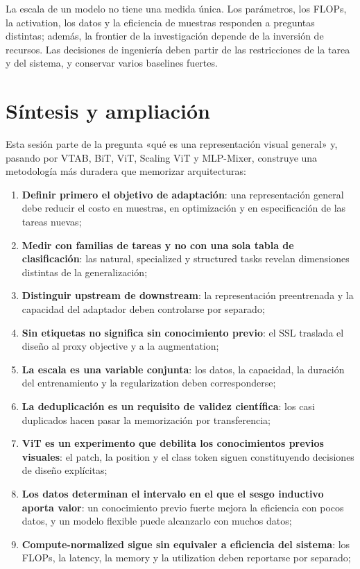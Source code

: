 \documentclass[a4paper]{article}
\begin{document}
La escala de un modelo no tiene una medida única. Los parámetros, los FLOPs, la activation, los datos y la eficiencia de muestras responden a preguntas distintas; además, la frontier de la investigación depende de la inversión de recursos. Las decisiones de ingeniería deben partir de las restricciones de la tarea y del sistema, y conservar varios baselines fuertes.
\section{Síntesis y ampliación}

Esta sesión parte de la pregunta «qué es una representación visual general» y, pasando por VTAB, BiT, ViT, Scaling ViT y MLP-Mixer, construye una metodología más duradera que memorizar arquitecturas:

\begin{enumerate}
  \item \textbf{Definir primero el objetivo de adaptación}: una representación general debe reducir el costo en muestras, en optimización y en especificación de las tareas nuevas;
  \item \textbf{Medir con familias de tareas y no con una sola tabla de clasificación}: las natural, specialized y structured tasks revelan dimensiones distintas de la generalización;
  \item \textbf{Distinguir upstream de downstream}: la representación preentrenada y la capacidad del adaptador deben controlarse por separado;
  \item \textbf{Sin etiquetas no significa sin conocimiento previo}: el SSL traslada el diseño al proxy objective y a la augmentation;
  \item \textbf{La escala es una variable conjunta}: los datos, la capacidad, la duración del entrenamiento y la regularization deben corresponderse;
  \item \textbf{La deduplicación es un requisito de validez científica}: los casi duplicados hacen pasar la memorización por transferencia;
  \item \textbf{ViT es un experimento que debilita los conocimientos previos visuales}: el patch, la position y el class token siguen constituyendo decisiones de diseño explícitas;
  \item \textbf{Los datos determinan el intervalo en el que el sesgo inductivo aporta valor}: un conocimiento previo fuerte mejora la eficiencia con pocos datos, y un modelo flexible puede alcanzarlo con muchos datos;
  \item \textbf{Compute-normalized sigue sin equivaler a eficiencia del sistema}: los FLOPs, la latency, la memory y la utilization deben reportarse por separado;

\end{enumerate}
\end{document}
